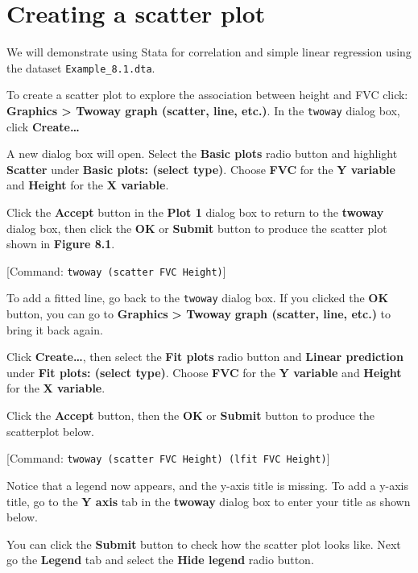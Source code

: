 \documentclass[
]{memoir}
\begin{document}
\hypertarget{creating-a-scatter-plot}{%
\section{Creating a scatter plot}\label{creating-a-scatter-plot}}

We will demonstrate using Stata for correlation and simple linear regression using the dataset \texttt{Example\_8.1.dta}.

To create a scatter plot to explore the association between height and FVC click: \textbf{Graphics \textgreater{} Twoway graph (scatter, line, etc.)}. In the \texttt{twoway} dialog box, click \textbf{Create\ldots{}}

A new dialog box will open. Select the \textbf{Basic plots} radio button and highlight \textbf{Scatter} under \textbf{Basic plots: (select type)}. Choose \textbf{FVC} for the \textbf{Y variable} and \textbf{Height} for the \textbf{X variable}.

Click the \textbf{Accept} button in the \textbf{Plot 1} dialog box to return to the \textbf{twoway} dialog box, then click the \textbf{OK} or \textbf{Submit} button to produce the scatter plot shown in \textbf{Figure 8.1}.

{[}Command: \texttt{twoway\ (scatter\ FVC\ Height)}{]}

To add a fitted line, go back to the \texttt{twoway} dialog box. If you clicked the \textbf{OK} button, you can go to \textbf{Graphics} \textbf{\textgreater{} Twoway} \textbf{graph (scatter, line, etc.)} to bring it back again.

Click \textbf{Create\ldots{}}, then select the \textbf{Fit plots} radio button and \textbf{Linear prediction} under \textbf{Fit plots: (select type)}. Choose \textbf{FVC} for the \textbf{Y variable} and \textbf{Height} for the \textbf{X variable}.

Click the \textbf{Accept} button, then the \textbf{OK} or \textbf{Submit} button to produce the scatterplot below.

{[}Command: \texttt{twoway\ (scatter\ FVC\ Height)\ (lfit\ FVC\ Height)}{]}

Notice that a legend now appears, and the y-axis title is missing. To add a y-axis title, go to the \textbf{Y axis} tab in the \textbf{twoway} dialog box to enter your title as shown below.

You can click the \textbf{Submit} button to check how the scatter plot looks like. Next go the \textbf{Legend} tab and select the \textbf{Hide legend} radio button.
\end{document}
